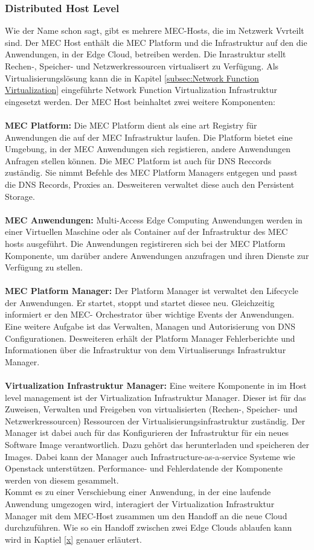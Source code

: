 \documentclass[runningheads]{llncs}
\numberwithin{figure}{section}
\begin{document}
\subsubsection{Distributed Host Level}
Wie der Name schon sagt, gibt es mehrere MEC-Hosts, die im Netzwerk Vvrteilt sind.
Der MEC Host enthält die MEC Platform und die Infrastruktur auf den die Anwendungen, in der Edge Cloud, betreiben werden.
Die Inrastruktur stellt Rechen-, Speicher- und Netzwerkressourcen virtualisert zu Verfügung. Als Virtualisierungslösung kann
die in Kapitel \ref{subsec:Network Function Virtualization} eingeführte Network Function Virtualization Infrastruktur
eingesetzt werden. Der MEC Host beinhaltet zwei weitere Komponenten:
\\
\\
\textbf{MEC Platform:} Die MEC Platform dient als eine art Registry für  
Anwendungen die auf der MEC Infrastruktur laufen. Die Platform bietet eine Umgebung, in der MEC Anwendungen sich registieren,
andere Anwendungen Anfragen stellen können. Die MEC Platform ist auch für DNS Reccords zuständig. Sie nimmt Befehle
des MEC Platform Managers entgegen und passt die DNS Records, Proxies an. Desweiteren verwaltet diese auch den Persistent Storage.
\\
\\
\textbf{MEC Anwendungen:} Multi-Access Edge Computing Anwendungen werden in einer Virtuellen Maschine oder als
Container auf der Infrastruktur des MEC hosts ausgeführt. Die Anwendungen registireren sich bei der MEC Platform
Komponente, um darüber andere Anwendungen anzufragen und ihren Dienste zur Verfügung zu stellen.
\\
\\
\textbf{MEC Platform Manager:} Der Platform Manager ist verwaltet den Lifecycle der Anwendungen. Er startet, stoppt und startet diesee neu.
Gleichzeitig informiert er den MEC- Orchestrator über wichtige Events der Anwendungen. 
Eine weitere Aufgabe ist das Verwalten, Managen und Autorisierung von DNS Configurationen.
Desweiteren erhält der Platform Manager Fehlerberichte und Informationen über die Infrastruktur von dem Virtualiserungs Infrastruktur Manager.
\\
\\ 
\textbf{Virtualization Infrastruktur Manager:} Eine weitere Komponente in im Host level management ist der Virtualization Infrastruktur
Manager. Dieser ist für das Zuweisen, Verwalten und Freigeben von virtualisierten (Rechen-, Speicher- und Netzwerkressourcen)
Ressourcen der Virtualisierungsinfrastruktur zuständig. Der Manager ist dabei auch für das Konfigurieren der Infrastruktur für 
ein neues Software Image verantwortlich. Dazu gehört das herunterladen und speicheren der Images. Dabei kann der Manager auch 
Infrastructure-as-a-service Systeme wie Openstack unterstützen. Performance- und Fehlerdatende der Komponente werden von diesem gesammelt.
\\
Kommt es zu einer Verschiebung einer Anwendung, in der eine laufende Anwendung umgezogen wird,
interagiert der Virtualization Infrastruktur Manager mit dem MEC-Host zusammen um den Handoff an die neue Cloud durchzuführen.
Wie so ein Handoff zwischen zwei Edge Clouds ablaufen kann wird in Kaptiel \ref{x} genauer erläutert.
\end{document}
